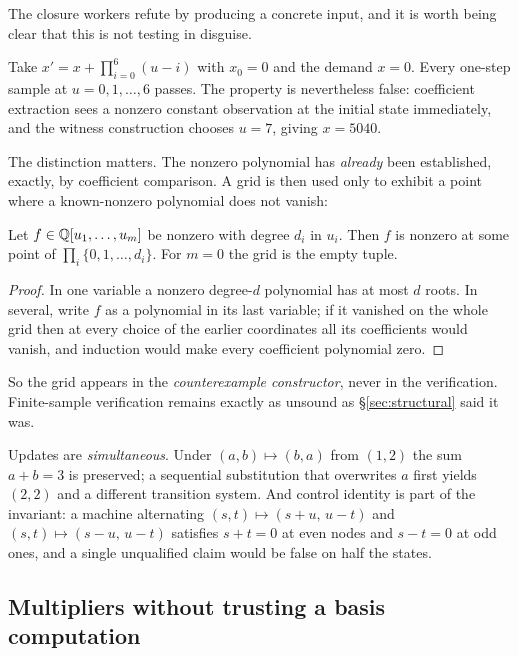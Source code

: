 The closure workers refute by producing a concrete input, and it is worth being
clear that this is not testing in disguise.

Take $x'=x+\prod_{i=0}^{6}(u-i)$ with $x_0=0$ and the demand $x=0$. Every
one-step sample at $u=0,1,\ldots,6$ passes. The property is nevertheless false:
coefficient extraction sees a nonzero constant observation at the initial state
immediately, and the witness construction chooses $u=7$, giving $x=5040$.

The distinction matters. The nonzero polynomial has \emph{already} been
established, exactly, by coefficient comparison. A grid is then used only to
exhibit a point where a known-nonzero polynomial does not vanish:

\begin{lemma}
\label{lem:grid}
Let $f\in\mathbb{Q}[u_1,\ldots,u_m]$ be nonzero with degree $d_i$ in $u_i$. Then $f$ is
nonzero at some point of $\prod_i\{0,1,\ldots,d_i\}$. For $m=0$ the grid is the
empty tuple.
\end{lemma}
\begin{proof}
In one variable a nonzero degree-$d$ polynomial has at most $d$ roots. In
several, write $f$ as a polynomial in its last variable; if it vanished on the
whole grid then at every choice of the earlier coordinates all its coefficients
would vanish, and induction would make every coefficient polynomial zero.
\end{proof}

So the grid appears in the \emph{counterexample constructor}, never in the
verification. Finite-sample verification remains exactly as unsound as
\S\ref{sec:structural} said it was.

\begin{remark}
Updates are \emph{simultaneous}. Under $(a,b)\mapsto(b,a)$ from $(1,2)$ the sum
$a+b=3$ is preserved; a sequential substitution that overwrites $a$ first yields
$(2,2)$ and a different transition system. And control identity is part of the
invariant: a machine alternating
$(s,t)\mapsto(s+u,\,u-t)$ and $(s,t)\mapsto(s-u,\,u-t)$ satisfies $s+t=0$ at
even nodes and $s-t=0$ at odd ones, and a single unqualified claim would be
false on half the states.
\end{remark}

\subsection{Multipliers without trusting a basis computation}
\label{sec:tracked-buchberger}

